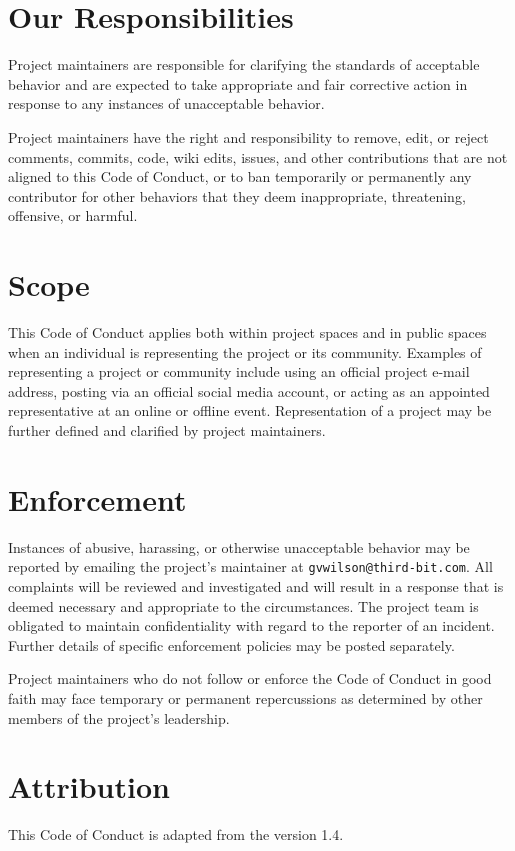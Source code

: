 \section{Our Responsibilities}\label{our-responsibilities-1}

Project maintainers are responsible for clarifying the standards of
acceptable behavior and are expected to take appropriate and fair
corrective action in response to any instances of unacceptable
behavior.

Project maintainers have the right and responsibility to remove, edit,
or reject comments, commits, code, wiki edits, issues, and other
contributions that are not aligned to this Code of Conduct, or to ban
temporarily or permanently any contributor for other behaviors that
they deem inappropriate, threatening, offensive, or harmful.

\section{Scope}\label{scope-1}

This Code of Conduct applies both within project spaces and in public
spaces when an individual is representing the project or its
community. Examples of representing a project or community include
using an official project e-mail address, posting via an official
social media account, or acting as an appointed representative at an
online or offline event. Representation of a project may be further
defined and clarified by project maintainers.

\section{Enforcement}\label{enforcement-1}

Instances of abusive, harassing, or otherwise unacceptable behavior
may be reported by emailing the project's maintainer at \texttt{gvwilson@third-bit.com}.
All complaints will be reviewed and investigated and will result in a
response that is deemed necessary and appropriate to the
circumstances. The project team is obligated to maintain
confidentiality with regard to the reporter of an incident. Further
details of specific enforcement policies may be posted separately.

Project maintainers who do not follow or enforce the Code of Conduct
in good faith may face temporary or permanent repercussions as
determined by other members of the project's leadership.

\section{Attribution}\label{attribution}

This Code of Conduct is adapted from
the  version 1.4.
